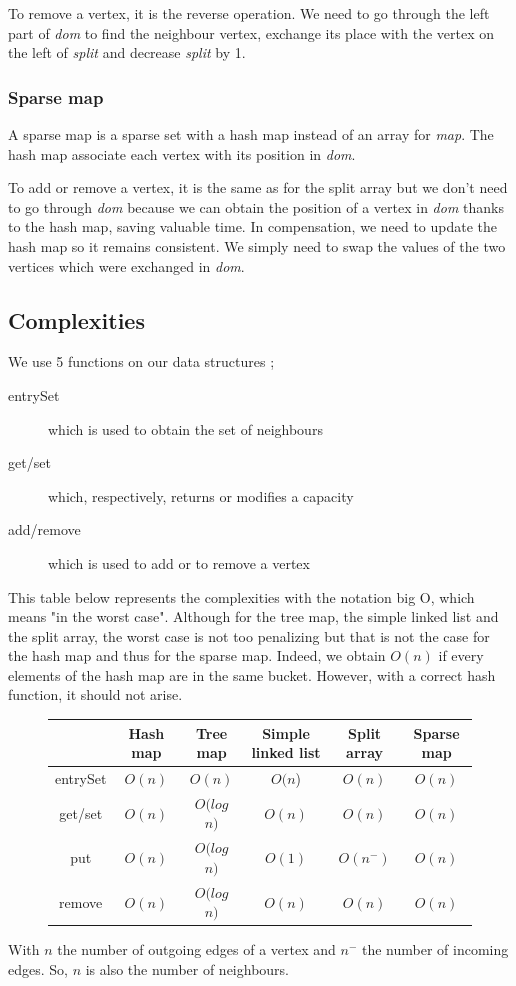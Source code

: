 To remove a vertex, it is the reverse operation. We need to go through the left part of \textit{dom} to find the neighbour vertex, exchange its place with the vertex on the left of \textit{split} and decrease \textit{split} by 1.
\subsubsection{Sparse map}
A sparse map is a sparse set with a hash map instead of an array for \textit{map}. The hash map associate each vertex with its position in \textit{dom}.

To add or remove a vertex, it is the same as for the split array but we don't need to go through \textit{dom} because we can obtain the position of a vertex in \textit{dom} thanks to the hash map, saving valuable time. In compensation, we need to update the hash map so it remains consistent. We simply need to swap the values of the two vertices which were exchanged in \textit{dom}.
\newpage
\subsection{Complexities}

We use 5 functions on our data structures ;
\begin{description}
\item[entrySet] which is used to obtain the set of neighbours
\item[get/set] which, respectively, returns or modifies a capacity
\item[add/remove] which is used to add or to remove a vertex
\end{description}


This table below represents the complexities with the notation big O, which means "in the worst case". Although for the tree map, the simple linked list and the split array, the worst case is not too penalizing but that is not the case for the hash map and thus for the sparse map. Indeed, we obtain $O(n)$ if every elements of the hash map are in the same bucket. However, with a correct hash function, it should not arise. \newline
\begin{figure}[H]
\centering
\begin{tabular}{|c|c|c|c|c|c|}
	\hline
     & \textbf{Hash map} & \textbf{Tree map} & \textbf{Simple linked list} & \textbf{Split array} & \textbf{Sparse map}\\
     \hline	
   entrySet & $O(n)$ & $O(n)$ & $O(n$) & $O(n)$ & $O(n)$ \\
   get/set & $O(n)$ & $O(log$ $n)$ & $O(n)$ & $O(n)$ & $O(n)$ \\
   put & $O(n)$ & $O(log$ $n)$ & $O(1)$ & $O(n^-)$ & $O(n)$ \\
   remove & $O(n)$ & $O(log$ $n)$ & $O(n)$ & $O(n)$ & $O(n)$ \\
   \hline
\end{tabular} 
\end{figure}

With $n$ the number of outgoing edges of a vertex and $n^-$ the number of incoming edges. So, $n$ is also the number of neighbours.